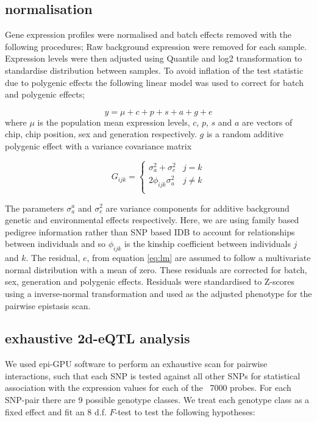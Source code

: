 \documentclass{article}
\begin{document}
\subsection{normalisation}

Gene expression profiles were normalised and batch effects removed with the following procedures; Raw background expression were removed for each sample. Expression levels were then adjusted using Quantile and log2 transformation to standardise distribution between samples. To avoid inflation of the test statistic due to polygenic effects the following linear model was used to correct for batch and polygenic effects;  

\begin{equation}
y = \mu + c + p + s + a + g + e
\label{eq:lm}
\end{equation}
where $\mu$ is the population mean expression levels, $c$, $p$, $s$ and $a$ are vectors of chip, chip position, sex and generation respectively. $g$ is a random additive polygenic effect with a variance covariance matrix 


\begin{equation}
G_{ijk} = \left \{ 
\begin{array}{ll}
\sigma _a ^2 + \sigma _e ^2&        j = k \\ 
2\phi _{ijk} \sigma _a ^2& 			j \neq k \\
\end{array} \right.
\end{equation}

The parameters $\sigma _a ^a$ and $\sigma _e ^2$ are variance components for additive background genetic and environmental effects respectively. Here, we are using family based pedigree information rather than SNP based IDB to account for relationships between individuals and so $\phi _{ijk}$ is the kinship coefficient between individuals $j$ and $k$. The residual, $e$, from equation \ref{eq:lm} are assumed to follow a multivariate normal distribution with a mean of zero. These residuals are corrected for batch, sex, generation and polygenic effects. Residuals were standardised to Z-scores using a inverse-normal transformation and used as the adjusted phenotype for the pairwise epistasis scan. 

\subsection{exhaustive 2d-eQTL analysis}
We used epi-GPU software to perform an exhaustive scan for pairwise interactions, such that each SNP is tested against all other SNPs for statistical association with the expression values for each of the ~7000 probes. For each SNP-pair there are 9 possible genotype classes. We treat each genotype class as a fixed effect and fit an 8 d.f. $F$-test to test the following hypotheses:
\end{document}

